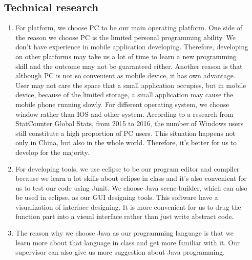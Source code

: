 \documentclass[paper=a4, fontsize=11pt,twoside]{scrartcl}		%
\begin{document}
\subsection{Technical research}
\begin{enumerate}
	\item For platform, we choose PC to be our main operating platform. One side of the reason we choose PC is the limited personal programming ability. We don’t have experience in mobile application developing. Therefore, developing on other platforms may take us a lot of time to learn a new programming skill and the outcome may not be guaranteed either. Another reason is that although PC is not so convenient as mobile device, it has own advantage. User may not care the space that a small application occupies, but in mobile device, because of the limited storage, a small application may cause the mobile phone running slowly. For different operating system, we choose window rather than IOS and other system. According to a research from StatCounter Global Stats, from 2015 to 2016, the number of Windows users still constitute a high proportion of PC users. This situation happens not only in China, but also in the whole world. Therefore, it’s better for us to develop for the majority.
	\item For developing tools, we use eclipse to be our program editor and compiler because we learn a lot skills about eclipse in class and it’s also convenient for us to test our code using Junit. We choose Java scene builder, which can also be used in eclipse, as our GUI designing tools. This software have a visualization of interface designing. It is more convenient for us to drug the function part into a visual interface rather than just write abstract code. 
	\item The reason why we choose Java as our programming language is that we learn more about that language in class and get more familiar with it. Our supervisor can also give us more suggestion about Java programming. 
	
\end{enumerate}
\end{document}
